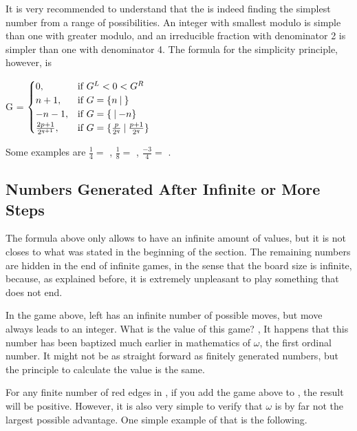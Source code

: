 It is very recommended to understand that the  is indeed finding the simplest number from a range of possibilities. An integer with smallest modulo is simple than one with greater modulo, and an irreducible fraction with denominator 2 is simpler than one with denominator 4. The formula for the simplicity principle, however, is 

G = 
$
\begin{cases}
	0, &\text{if } G^L < 0 < G^R\\
	n+1, &\text{if } \mbox{$G= \mbox{$\{n\:|\:\}$}$}\\
	-n-1, &\text{if } \mbox{$G= \mbox{$\{\:|\:{-}n\}$}$}\\
	\frac{2p + 1}{2^{q+1}}, &\text{if } \mbox{$G= \mbox{$\{\frac{p}{2^q}\:|\: \frac{p+1}{2^q}\}$}$}
\end{cases}
$

\vspace{0.6em}Some examples are $\frac{1}{4} =$ , $\frac{1}{8} =$ , $\frac{-3}{4} =$ .

\subsection*{Numbers Generated After Infinite or More Steps}

The formula above only allows \Gm{} to have an infinite amount of values, but it is not closes to what was stated in the beginning of the section. The remaining numbers are hidden in the end of infinite games, in the sense that the board size is infinite, because, as explained before, it is extremely unpleasant to play something that does not end. 



In the game above, left has an infinite number of possible moves, but  move always leads to an integer. What is the value of this game? , It happens that this number has been baptized much earlier in mathematics of $\omega$, the first ordinal number. It might not be as straight forward as finitely generated numbers, but the principle to calculate the value is the same.

For any finite number of red edges in \Gm{}, if you add the game above to \Gm{}, the result will be positive. However, it is also very simple to verify that $\omega$ is by far not the largest possible advantage. One simple  example of that is the following.



